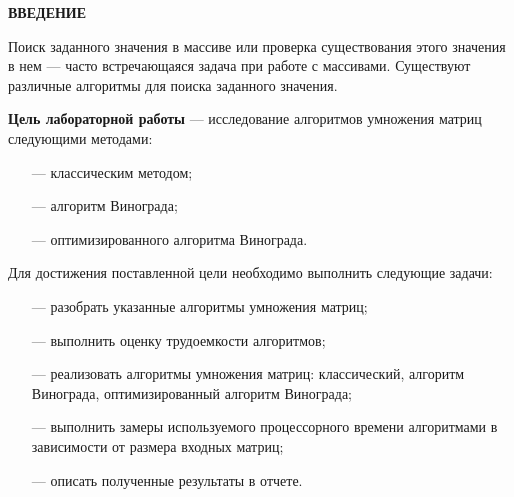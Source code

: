 \begin{center}
    \textbf{ВВЕДЕНИЕ}
\end{center}

Поиск заданного значения в массиве или проверка существования этого значения в нем --- часто встречающаяся задача при работе с массивами. Существуют различные алгоритмы для поиска заданного значения.

\textbf{Цель лабораторной работы} --- исследование алгоритмов умножения матриц следующими методами:
\begin{itemize}
    \item[---] классическим методом;
    \item[---] алгоритм Винограда;
    \item[---] оптимизированного алгоритма Винограда.
\end{itemize}

Для достижения поставленной цели необходимо выполнить следующие задачи:
\begin{itemize}
    \item[---] разобрать указанные алгоритмы умножения матриц;
    \item[---] выполнить оценку трудоемкости алгоритмов;
    \item[---] реализовать алгоритмы умножения матриц: классический, алгоритм Винограда, оптимизированный алгоритм Винограда;
    \item[---] выполнить замеры используемого процессорного времени алгоритмами в зависимости от размера входных матриц;
    \item[---] описать полученные результаты в отчете.
\end{itemize}